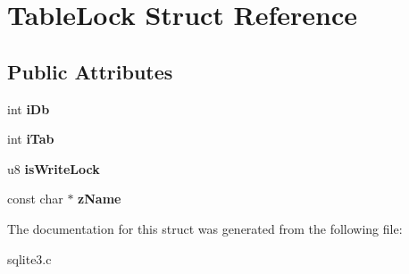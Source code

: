 \hypertarget{struct_table_lock}{\section{Table\-Lock Struct Reference}
\label{struct_table_lock}
}
\subsection*{Public Attributes}
\begin{DoxyCompactItemize}
\item 
\hypertarget{struct_table_lock_ad5cc726ef29ffcca39ec0b72942513f6}{int {\bfseries i\-Db}}\label{struct_table_lock_ad5cc726ef29ffcca39ec0b72942513f6}

\item 
\hypertarget{struct_table_lock_ab25b5d9ba21ed96ed68ce8064ff84e24}{int {\bfseries i\-Tab}}\label{struct_table_lock_ab25b5d9ba21ed96ed68ce8064ff84e24}

\item 
\hypertarget{struct_table_lock_a171121af9886ee08044d4b82b991ceeb}{u8 {\bfseries is\-Write\-Lock}}\label{struct_table_lock_a171121af9886ee08044d4b82b991ceeb}

\item 
\hypertarget{struct_table_lock_ad1ce077fbd2600dd6d23ec08706dd227}{const char $\ast$ {\bfseries z\-Name}}\label{struct_table_lock_ad1ce077fbd2600dd6d23ec08706dd227}

\end{DoxyCompactItemize}


The documentation for this struct was generated from the following file\-:\begin{DoxyCompactItemize}
\item 
sqlite3.\-c\end{DoxyCompactItemize}
